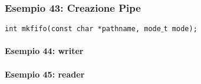         \subsubsection{Esempio 43: Creazione Pipe}
        \texttt{int mkfifo(const char *pathname, mode$\_$t mode);} %
            
            \paragraph{Esempio 44: writer} \hfill \break
               
            
            \paragraph{Esempio 45: reader}\hfill \break
               
            
